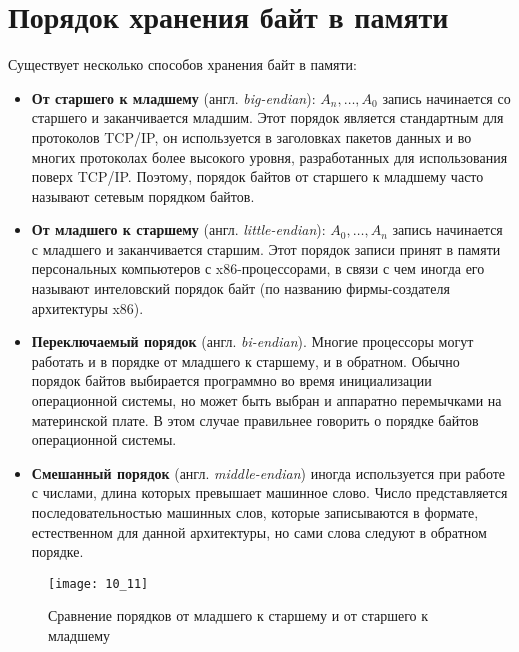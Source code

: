 \section{Порядок хранения байт в памяти}
Существует несколько способов хранения байт в памяти:
\begin{itemize}
  \item \textbf{От старшего к младшему} (англ. \emph{big-endian}): $A_n,\dots,A_0$ запись начинается со старшего и заканчивается младшим. Этот порядок является стандартным для протоколов TCP/IP, он используется в заголовках пакетов данных и во многих протоколах более высокого уровня, разработанных для использования поверх TCP/IP. Поэтому, порядок байтов от старшего к младшему часто называют сетевым порядком байтов.
  \item \textbf{От младшего к старшему} (англ. \emph{little-endian}): $A_0,\dots,A_n$ запись начинается с младшего и заканчивается старшим. Этот порядок записи принят в памяти персональных компьютеров с x86-процессорами, в связи с чем иногда его называют интеловский порядок байт (по названию фирмы-создателя архитектуры x86).
  \item \textbf{Переключаемый порядок} (англ. \emph{bi-endian}). Многие процессоры могут работать и в порядке от младшего к старшему, и в обратном. Обычно порядок байтов выбирается программно во время инициализации операционной системы, но может быть выбран и аппаратно перемычками на материнской плате. В этом случае правильнее говорить о порядке байтов операционной системы.
  \item \textbf{Смешанный порядок} (англ. \emph{middle-endian}) иногда используется при работе с числами, длина которых превышает машинное слово. Число представляется последовательностью машинных слов, которые записываются в формате, естественном для данной архитектуры, но сами слова следуют в обратном порядке.
\end{itemize}
\begin{figure}[h]
\texttt{[image: 10\_11]}
\caption{Сравнение порядков от младшего к старшему и от старшего к младшему}
\end{figure}